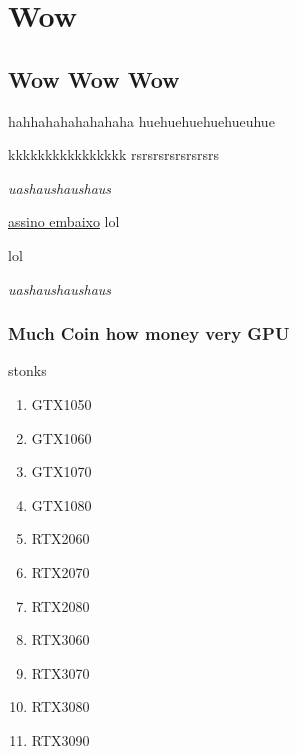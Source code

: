 \documentclass{utfpr-pg}
\begin{document}
\chapter{Wow}

\section{Wow Wow Wow}

hahhahahahahahaha
huehuehuehuehueuhue

kkkkkkkkkkkkkkkk
rsrsrsrsrsrsrsrs

\textit{uashaushaushaus}

\underline{assino embaixo}
lol
\par
lol

\textit{uashaushaushaus}

\subsection{Much Coin how money very GPU}

stonks

\begin{enumerate} 
\item GTX1050
\item GTX1060
\item GTX1070
\item GTX1080
\item RTX2060
\item RTX2070
\item RTX2080
\item RTX3060
\item RTX3070
\item RTX3080
\item RTX3090
\end{enumerate}
\end{document}
